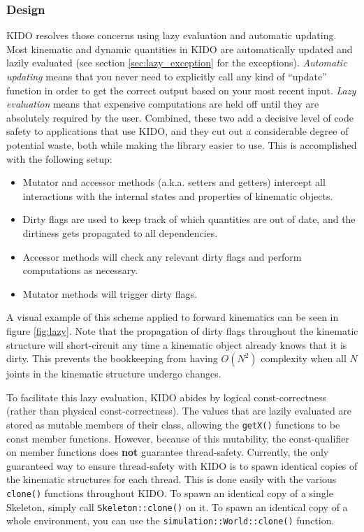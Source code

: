 \subsubsection{Design}

KIDO resolves those concerns using lazy evaluation and automatic updating. Most kinematic and dynamic quantities in KIDO are automatically updated and lazily evaluated (see section \ref{sec:lazy_exception} for the exceptions). \textit{Automatic updating} means that you never need to explicitly call any kind of ``update'' function in order to get the correct output based on your most recent input. \textit{Lazy evaluation} means that expensive computations are held off until they are absolutely required by the user. Combined, these two add a decisive level of code safety to applications that use KIDO, and they cut out a considerable degree of potential waste, both while making the library easier to use. This is accomplished with the following setup:

\begin{itemize}
  \item Mutator and accessor methods (a.k.a. setters and getters) intercept all interactions with the internal states and properties of kinematic objects.
  \item Dirty flags are used to keep track of which quantities are out of date, and the dirtiness gets propagated to all dependencies.
  \item Accessor methods will check any relevant dirty flags and perform computations as necessary.
  \item Mutator methods will trigger dirty flags.
\end{itemize}

A visual example of this scheme applied to forward kinematics can be seen in figure \ref{fig:lazy}. Note that the propagation of dirty flags throughout the kinematic structure will short-circuit any time a kinematic object already knows that it is dirty. This prevents the bookkeeping from having $O(N^2)$ complexity when all $N$ joints in the kinematic structure undergo changes.

To facilitate this lazy evaluation, KIDO abides by logical const-correctness (rather than physical const-correctness). The values that are lazily evaluated are stored as mutable members of their class, allowing the \texttt{getX()} functions to be const member functions. However, because of this mutability, the const-qualifier on member functions does \textbf{not} guarantee thread-safety. Currently, the only guaranteed way to ensure thread-safety with KIDO is to spawn identical copies of the kinematic structures for each thread. This is done easily with the various \texttt{clone()} functions throughout KIDO. To spawn an identical copy of a single Skeleton, simply call \texttt{Skeleton::clone()} on it. To spawn an identical copy of a whole environment, you can use the \texttt{simulation::World::clone()} function.

